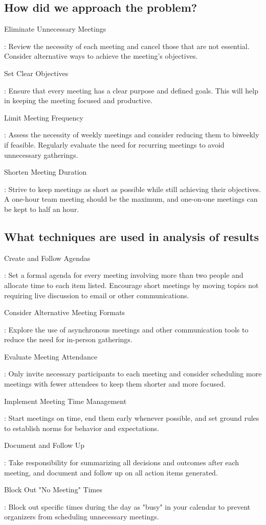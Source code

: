 \documentclass[runningheads]{llncs}
\begin{document}
\subsection{How did we approach the problem?}
\begin{enumerate}
{\bfseries \item Eliminate Unnecessary Meetings}: 
 Review the necessity of each meeting and cancel those that are not essential. Consider alternative ways to achieve the meeting's objectives.
{\bfseries \item  Set Clear Objectives}: Ensure that every meeting has a clear purpose and defined goals. This will help in keeping the meeting focused and productive.
{\bfseries \item Limit Meeting Frequency}: Assess the necessity of weekly meetings and consider reducing them to biweekly if feasible. Regularly evaluate the need for recurring meetings to avoid unnecessary gatherings.
{\bfseries \item  Shorten Meeting Duration}: Strive to keep meetings as short as possible while still achieving their objectives. A one-hour team meeting should be the maximum, and one-on-one meetings can be kept to half an hour.
\end{enumerate}
\subsection{What techniques are used in analysis of results}
\begin{enumerate}
{\bfseries \item Create and Follow Agendas}: Set a formal agenda for every meeting involving more than two people and allocate time to each item listed. Encourage short meetings by moving topics not requiring live discussion to email or other communications.
{\bfseries \item  Consider Alternative Meeting Formats}: Explore the use of asynchronous meetings and other communication tools to reduce the need for in-person gatherings.
{\bfseries \item  Evaluate Meeting Attendance}: Only invite necessary participants to each meeting and consider scheduling more meetings with fewer attendees to keep them shorter and more focused.
{\bfseries \item  Implement Meeting Time Management}: Start meetings on time, end them early whenever possible, and set ground rules to establish norms for behavior and expectations.
{\bfseries \item  Document and Follow Up}: Take responsibility for summarizing all decisions and outcomes after each meeting, and document and follow up on all action items generated.
{\bfseries \item Block Out "No Meeting" Times}: Block out specific times during the day as "busy" in your calendar to prevent organizers from scheduling unnecessary meetings.
\end{enumerate}
\end{document}
